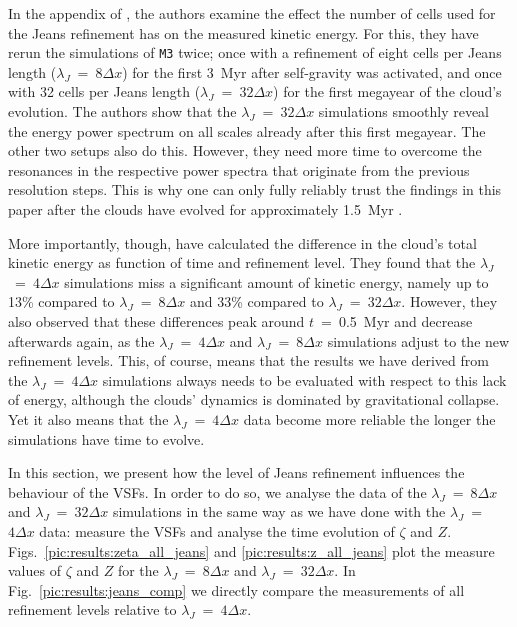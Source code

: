 In the appendix of , the authors examine the effect the number of cells used for the Jeans refinement has on the measured kinetic energy.
For this, they have rerun the simulations of \texttt{M3} twice; 
once with a refinement of eight cells per Jeans length ($\lambda_J$~=~$8\Delta{}x$) for the first 3~Myr after self-gravity was activated, and once with 32 cells per Jeans length ($\lambda_J$~=~$32\Delta{}x$) for the first megayear of the cloud's evolution.
The authors show that the $\lambda_J$~=~$32\Delta{}x$ simulations smoothly reveal the energy power spectrum on all scales already after this first megayear.
The other two setups also do this.
However, they need more time to overcome the resonances in the respective power spectra that originate from the previous resolution steps. 
This is why one can only fully reliably trust the findings in this paper after the clouds have evolved for approximately 1.5~Myr \citep[see also][]{IbanezMejia2017,Seifried2017b}.

More importantly, though,  have calculated the difference in the cloud's total kinetic energy as function of time and refinement level.
They found that the $\lambda_J$~=~$4\Delta{}x$ simulations miss a significant amount of kinetic energy, namely up to 13\% compared to $\lambda_J$~=~$8\Delta{}x$ and 33\% compared to $\lambda_J$~=~$32\Delta{}x$.
However, they also observed that these differences peak around $t$~=~0.5~Myr and decrease afterwards again, as the $\lambda_J$~=~$4\Delta{}x$ and $\lambda_J$~=~$8\Delta{}x$ simulations adjust to the new refinement levels.
This, of course, means that the results we have derived from the $\lambda_J$~=~$4\Delta{}x$ simulations always needs to be evaluated with respect to this lack of energy, although the clouds' dynamics is dominated by gravitational collapse.
Yet it also means that the $\lambda_J$~=~$4\Delta{}x$ data become more reliable the longer the simulations have time to evolve.

In this section, we present how the level of Jeans refinement influences the behaviour of the VSFs.
In order to do so, we analyse the data of the $\lambda_J$~=~$8\Delta{}x$ and $\lambda_J$~=~$32\Delta{}x$ simulations in the same way as we have done with the $\lambda_J$~=~$4\Delta{}x$ data: measure the VSFs and analyse the time evolution of $\zeta$ and $Z$.
Figs.~\ref{pic:results:zeta_all_jeans} and \ref{pic:results:z_all_jeans} plot the measure values of $\zeta$ and $Z$ for the $\lambda_J$~=~$8\Delta{}x$ and $\lambda_J$~=~$32\Delta{}x$.
In Fig.~\ref{pic:results:jeans_comp} we directly compare the measurements of all refinement levels relative to $\lambda_J$~=~$4\Delta{}x$.


